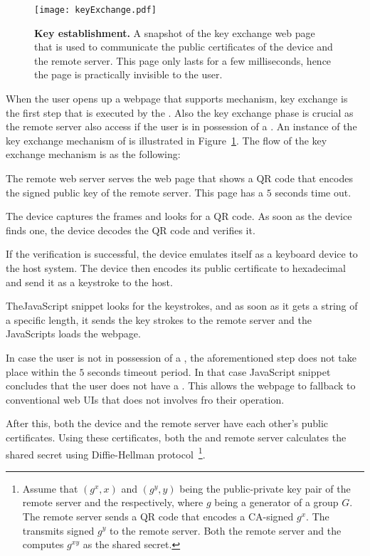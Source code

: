 \begin{figure}[t]
\centering
\texttt{[image: keyExchange.pdf]}
\caption{\textbf{Key establishment.} A snapshot of the key exchange web page that is used to communicate the public certificates of the device and the remote server. This page only lasts for a few milliseconds, hence the page is practically invisible to the user.}
\label{fig:keyExchange}
\centering
\end{figure}

When the user opens up a webpage that supports \name mechanism, key exchange is the first step that is executed by the \device. Also the key exchange phase is crucial as the remote server also access if the user is in possession of a \device. An instance of the key exchange mechanism of \name is illustrated in Figure~\ref{fig:keyExchange}. The flow of the key exchange mechanism is as the following:

\begin{mylist}
  \item The remote web server serves the web page that shows a QR code that encodes the signed public key of the remote server. This page has a $5$ seconds time out.
  \item The device captures the frames and looks for a QR code. As soon as the device finds one, the device decodes the QR code and verifies it.
  \item If the verification is successful, the device emulates itself as a keyboard device to the host system. The device then encodes its public certificate to hexadecimal and send it as a keystroke to the host.
  \item The\name  JavaScript snippet looks for the keystrokes, and as soon as it gets a string of a specific length, it sends the key strokes to the remote server and the \name JavaScripts loads the webpage.
  \item In case the user is not in possession of a \device, the aforementioned step does not take place within the $5$ seconds timeout period. In that case \name JavaScript snippet concludes that the user does not have a \device. This allows the webpage to fallback to conventional web UIs that does not involves \device fro their operation.
\end{mylist}

After this, both the device and the remote server have each other's public certificates. Using these certificates, both the \device and remote server calculates the shared secret using Diffie-Hellman protocol~\footnote{Assume that $(g^x, x)$ and $(g^y, y)$ being the public-private key pair of the remote server and the \device respectively, where $g$ being a generator of a group $G$. The remote server sends a QR code that encodes a CA-signed $g^x$. The \device transmits signed $g^y$ to the remote server. Both the remote server and the \device computes $g^{xy}$ as the shared secret.}.



